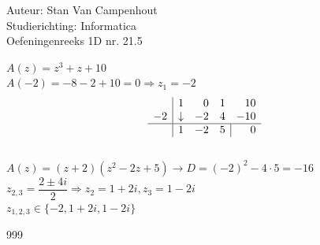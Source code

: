 \documentclass[a4paper]{article}
\begin{document}
  
\noindent \large Auteur: Stan Van Campenhout \\
\noindent \large Studierichting:  Informatica\\
\noindent \large Oefeningenreeks 1D nr. 21.5\\

\medskip

\normalsize

$ A(z) = z^3 + z + 10 $\\

$ A(-2) = -8 -2 +10 = 0 \Rightarrow z_{1} = -2 $\\

 \[ \begin{array}{c|rrrr}     
& 1 & 0 & 1 & 10 \\      
-2 & \downarrow  & -2  & 4    & -10   \\ \hline    
 & 1  & -2  &  \multicolumn{1}{c|}{5}  & 0   
\end{array} \] \\

$ A(z) = (z + 2)(z^2 - 2z + 5) \rightarrow D = (-2)^2 -4 \cdot 5 = -16 $\\

$ z_{2,3} = \dfrac{2 \pm 4i}{2} \Rightarrow z_{2} = 1 + 2i, z_{3} = 1 - 2i $\\

$ z_{1,2,3} \in \{-2, 1 + 2i, 1 - 2i\} $\\

\begin{thebibliography}{999}
\end{thebibliography}
\end{document}
